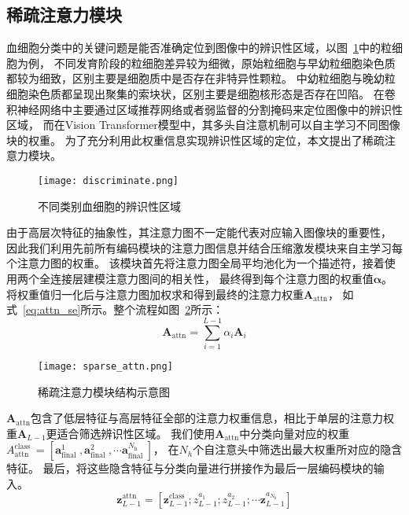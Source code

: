 \subsection{稀疏注意力模块}
血细胞分类中的关键问题是能否准确定位到图像中的辨识性区域，以图~\ref{fig:discriminate}中的粒细胞为例，
不同发育阶段的粒细胞差异较为细微，原始粒细胞与早幼粒细胞染色质都较为细致，区别主要是细胞质中是否存在非特异性颗粒。
中幼粒细胞与晚幼粒细胞染色质都呈现出聚集的索块状，区别主要是细胞核形态是否存在凹陷。
在卷积神经网络中主要通过区域推荐网络或者弱监督的分割掩码来定位图像中的辨识性区域，
而在Vision Transformer模型中，其多头自注意机制可以自主学习不同图像块的权重。
为了充分利用此权重信息实现辨识性区域的定位，本文提出了稀疏注意力模块。
\begin{figure} 
   \centering   
   \texttt{[image: discriminate.png]}   
   \caption{不同类别血细胞的辨识性区域}   
   \label{fig:discriminate} 
\end{figure}  

由于高层次特征的抽象性，其注意力图不一定能代表对应输入图像块的重要性，
因此我们利用先前所有编码模块的注意力图信息并结合压缩激发模块来自主学习每个注意力图的权重。
该模块首先将注意力图全局平均池化为一个描述符，接着使用两个全连接层建模注意力图间的相关性，
最终得到每个注意力图的权重值$\mathbf{\alpha}$。将权重值归一化后与注意力图加权求和得到最终的注意力权重$\boldsymbol{A}_{\mathrm{attn}}$，
如式~\ref{eq:attn_se}所示。整个流程如图~\ref{fig:sparse_attn}所示：
\begin{equation}
  \boldsymbol{A}_{\mathrm{attn}}=\sum_{i=1}^{L-1} \alpha_{i} \boldsymbol{A}_{i}
  \label{eq:attn_se}
\end{equation}

\begin{figure} 
   \centering   
   \texttt{[image: sparse\_attn.png]}   
   \caption{稀疏注意力模块结构示意图}   
   \label{fig:sparse_attn} 
\end{figure}  

$\boldsymbol{A}_{\mathrm{attn}}$包含了低层特征与高层特征全部的注意力权重信息，相比于单层的注意力权重$\boldsymbol{A}_{L-1}$更适合筛选辨识性区域。
我们使用$\boldsymbol{A}_{\mathrm{attn}}$中分类向量对应的权重$A_{\mathrm{attn}}^{\text {class }}=\left[\boldsymbol{a}_{\text {final }}^{1}, \boldsymbol{a}_{\text {final }}^{2}, \cdots \boldsymbol{a}_{\text {final }}^{N_{\mathrm{h}}}\right]$，
在$N_h$个自注意头中筛选出最大权重所对应的隐含特征。
最后，将这些隐含特征与分类向量进行拼接作为最后一层编码模块的输入。
\begin{equation}
  \mathbf{z}_{L-1}^{\mathrm{attn}}=\left[\mathbf{z}_{L-1}^{\text {class }} ; z_{L-1}^{a_{1}} ; z_{L-1}^{a_{2}} ; \cdots \mathbf{z}_{L-1}^{a_{N_{h}}}\right]
  \label{eq:attn_se_out}
\end{equation}

